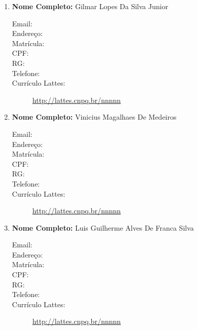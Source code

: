 \documentclass[a4paper,12pt]{article} %
\begin{document}
\begin{enumerate}
    \item \textbf{Nome Completo: } Gilmar Lopes Da Silva Junior
    \begin{description}
        \item [Email:] 
        \item [Endereço:]
        \item [Matrícula:]
        \item [CPF:]
        \item [RG:]
        \item [Telefone:]
        \item [Currículo Lattes:] \url{http://lattes.cnpq.br/nnnnn}
    \end{description}

    \item \textbf{Nome Completo:} Vinicius Magalhaes De Medeiros
    \begin{description}
        \item [Email:] 
        \item [Endereço:]
        \item [Matrícula:]
        \item [CPF:]
        \item [RG:]
        \item [Telefone:]
        \item [Currículo Lattes:] \url{http://lattes.cnpq.br/nnnnn}
    \end{description}

    \item \textbf{Nome Completo:} Luis Guilherme Alves De Franca Silva
    \begin{description}
        \item [Email:] 
        \item [Endereço:]
        \item [Matrícula:]
        \item [CPF:]
        \item [RG:]
        \item [Telefone:]
        \item [Currículo Lattes:] \url{http://lattes.cnpq.br/nnnnn}
    \end{description}



\end{enumerate}
\end{document}
